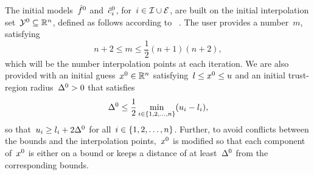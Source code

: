 The initial models~$\objm[0]$ and~$\conm[0]{i}$, for~$i \in \mathcal{I} \cup \mathcal{E}$, are built on the initial interpolation set~$\xpt[0] \subseteq \R^n$, defined as follows according to \citeauthor{Powell_2009}~\cite{Powell_2009}.
The user provides a number~$m$, satisfying
\begin{equation*}
    n + 2 \le m \le \frac{1}{2} (n + 1) (n + 2),
\end{equation*}
which will be the number interpolation points at each iteration.
We are also provided with an initial guess~$\iter[0] \in \R^n$ satisfying~$\xl \le \iter[0] \le \xu$ and an initial trust-region radius~$\rad[0] > 0$ that satisfies
\begin{equation*}
    \rad[0] \le \frac{1}{2} \min_{i \in \set{1, 2, \dots, n}} (\xu_i - \xl_i),
\end{equation*}
so that~$\xu_i \ge \xl_i + 2 \rad[0]$ for all~$i \in \{1, 2, \dots, n\}$.
Further, to avoid conflicts between the bounds and the interpolation points,~$\iter[0]$ is modified so that each component of~$\iter[0]$ is either on a bound or keeps a distance of at least~$\rad[0]$ from the corresponding bounds.

